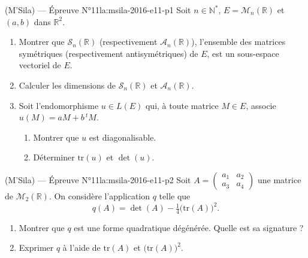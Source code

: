 \newpage

\begin{problem}{(M'Sila) — Épreuve N°11}{la:msila-2016-e11-p1}
Soit $n \in \mathbb{N}^*$, $E = \mathscr{M}_n(\mathbb{R})$ et $(a, b)$ dans
$\mathbb{R}^2$.
\begin{enumerate}
\item Montrer que $\mathscr{S}_n(\mathbb{R})$ (respectivement
      $\mathscr{A}_n(\mathbb{R})$), l'ensemble des matrices symétriques
      (respectivement antisymétriques) de $E$, est un sous-espace vectoriel de $E$.
\item Calculer les dimensions de $\mathscr{S}_n(\mathbb{R})$ et
      $\mathscr{A}_n(\mathbb{R})$.
\item Soit l'endomorphisme $u \in L(E)$ qui, à toute matrice $M \in E$, associe
      $u(M) = aM + b\,{}^tM$.
      \begin{enumerate}
      \item Montrer que $u$ est diagonalisable.
      \item Déterminer $\mathrm{tr}(u)$ et $\det(u)$.
      \end{enumerate}
\end{enumerate}

\end{problem}

\newpage

\begin{problem}{(M'Sila) — Épreuve N°11}{la:msila-2016-e11-p2}
Soit $A = \begin{pmatrix} a_1 & a_2 \\ a_3 & a_4 \end{pmatrix}$ une matrice de
$\mathscr{M}_2(\mathbb{R})$. On considère l'application $q$ telle que
$$
q(A) = \det(A) - \tfrac{1}{4}\big(\mathrm{tr}(A)\big)^2.
$$
\begin{enumerate}
\item Montrer que $q$ est une forme quadratique dégénérée. Quelle est sa signature ?
\item Exprimer $q$ à l'aide de $\mathrm{tr}(A)$ et $\big(\mathrm{tr}(A)\big)^2$.
\end{enumerate}

\end{problem}

\newpage

